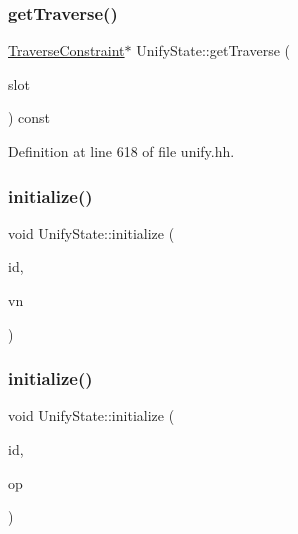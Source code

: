 \mbox{\label{class_unify_state_a924f75674fb194162125e16607b88585}} 
\subsubsection{\texorpdfstring{getTraverse()}{getTraverse()}}
{\footnotesize\ttfamily \mbox{\hyperlink{class_traverse_constraint}{Traverse\+Constraint}}$\ast$ Unify\+State\+::get\+Traverse (\begin{DoxyParamCaption}\item[{int4}]{slot }\end{DoxyParamCaption}) const\hspace{0.3cm}{\ttfamily [inline]}}



Definition at line 618 of file unify.\+hh.

\mbox{\label{class_unify_state_a25a26aac2d13be866fa6e7d35ae022b4}} 
\subsubsection{\texorpdfstring{initialize()}{initialize()}\hspace{0.1cm}{\footnotesize\ttfamily [1/2]}}
{\footnotesize\ttfamily void Unify\+State\+::initialize (\begin{DoxyParamCaption}\item[{int4}]{id,  }\item[{\mbox{\hyperlink{class_varnode}{Varnode}} $\ast$}]{vn }\end{DoxyParamCaption})}

\mbox{\label{class_unify_state_a3f727743d0832da95a691d3d2153d180}} 
\subsubsection{\texorpdfstring{initialize()}{initialize()}\hspace{0.1cm}{\footnotesize\ttfamily [2/2]}}
{\footnotesize\ttfamily void Unify\+State\+::initialize (\begin{DoxyParamCaption}\item[{int4}]{id,  }\item[{\mbox{\hyperlink{class_pcode_op}{Pcode\+Op}} $\ast$}]{op }\end{DoxyParamCaption})}

